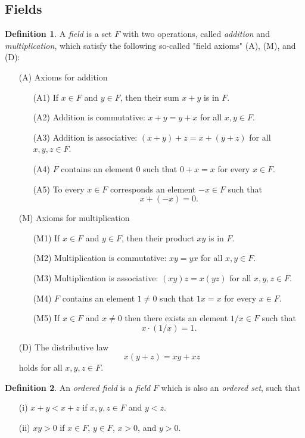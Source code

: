 \documentclass[11pt]{article}
\theoremstyle{definition}
\newtheorem{definition}{Definition}[section]
\theoremstyle{plain}
\theoremstyle{remark}
\begin{document}
\subsection{Fields}
\begin{definition}
A \emph{field} is a set $F$ with two operations, called \emph{addition} and \emph{multiplication}, which satisfy the following so-called "field axioms" (A), (M), and (D):
\begin{enumerate}
\item[(A)] Axioms for addition
\begin{itemize}
    \item[(A1)] If $x \in F$ and $y \in F$, then their sum $x+y$ is in $F$.
    \item[(A2)] Addition is commutative: $x+y=y+x$ for all $x,y \in F$.
    \item[(A3)] Addition is associative: $(x+y)+z=x+(y+z)$ for all $x,y,z \in F$.
    \item[(A4)] $F$ contains an element $0$ such that $0+x=x$ for every $x \in F$.
    \item[(A5)] To every $x \in F$ corresponds an element $-x \in F$ such that \[x+(-x)=0.\]
\end{itemize}
\item[(M)] Axioms for multiplication
\begin{itemize}
    \item[(M1)] If $x \in F$ and $y \in F$, then their product $xy$ is in $F$.
    \item[(M2)] Multiplication is commutative: $xy=yx$ for all $x,y \in F$.
    \item[(M3)] Multiplication is associative: $(xy)z=x(yz)$ for all $x,y,z \in F$.
    \item[(M4)] $F$ contains an element $1 \neq 0$ such that $1x=x$ for every $x \in F$.
    \item[(M5)] If $x \in F$ and $x \neq 0$ then there exists an element $1/x \in F$ such that \[x \cdot (1/x) = 1.\]
\end{itemize}
\item[(D)] The distributive law
\[
x(y+z)=xy+xz
\]
holds for all $x,y,z \in F$.
\end{enumerate}
\end{definition}
\begin{definition}
An \emph{ordered field} is a \emph{field} $F$ which is also an \emph{ordered set}, such that
\begin{itemize}
    \item[(i)] $x+y<x+z$ if $x,y,z \in F$ and $y<z$.
    \item[(ii)] $xy>0$ if $x \in F$, $y \in F$, $x>0$, and $y>0$.
\end{itemize}
\end{definition}
\end{document}
